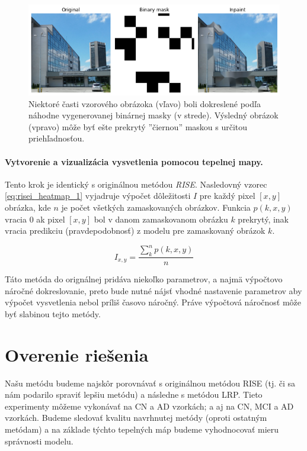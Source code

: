\begin{figure}[h!]
    \centering
    \includegraphics[width=13cm]{assets/images/risei_inpainting_example.png}
    \caption{Niektoré časti vzorového obrázoka (vľavo) boli dokreslené podľa náhodne vygenerovanej binárnej masky (v strede). Výsledný obrázok (vpravo) môže byť ešte prekrytý ''čiernou'' maskou s určitou priehľadnosťou.}
    \label{fig:risei_inpainting_example}
\end{figure}

\paragraph{Vytvorenie a vizualizácia vysvetlenia pomocou tepelnej mapy.}

Tento krok je identický s originálnou metódou \textit{RISE}. Nasledovný vzorec \ref{eq:risei_heatmap_1} vyjadruje výpočet dôležitosti $I$ pre každý pixel $[x, y]$ obrázka, kde $n$ je počet všetkých zamaskovaných obrázkov. Funkcia $p(k, x, y)$ vracia $0$ ak pixel $[x, y]$ bol v danom zamaskovanom obrázku $k$ prekrytý, inak vracia predikciu (pravdepodobnosť) z modelu pre zamaskovaný obrázok $k$.

\begin{equation}
    I_{x, y} = \frac{\sum_{k}^{n} p(k, x, y)}{n}
    \label{eq:risei_heatmap_1}
\end{equation}

Táto metóda do orignálnej pridáva niekoľko parametrov, a najmä výpočtovo náročné dokreslovanie, preto bude nutné nájsť vhodné nastavenie parametrov aby výpočet vysvetlenia nebol príliš časovo náročný. Práve výpočtová náročnosť môže byť slabinou tejto metódy.

\section{Overenie riešenia}

Našu metódu budeme najskôr porovnávať s originálnou metódou RISE (tj. či sa nám podarilo spraviť lepšiu metódu) a následne s metódou LRP. Tieto experimenty môžeme vykonávať na CN a AD vzorkách; a aj na CN, MCI a AD vzorkách. Budeme sledovať kvalitu navrhnutej metódy (oproti ostatným metódam) a na základe týchto tepelných máp budeme vyhodnocovať mieru správnosti modelu.


